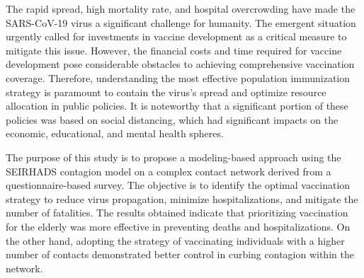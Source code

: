The rapid spread, high mortality rate, and hospital overcrowding have made the SARS-CoV-19 virus a significant challenge for humanity. The emergent situation urgently called for investments in vaccine development as a critical measure to mitigate this issue. However, the financial costs and time required for vaccine development pose considerable obstacles to achieving comprehensive vaccination coverage. Therefore, understanding the most effective population immunization strategy is paramount to contain the virus's spread and optimize resource allocation in public policies. It is noteworthy that a significant portion of these policies was based on social distancing, which had significant impacts on the economic, educational, and mental health spheres.

The purpose of this study is to propose a modeling-based approach using the SEIRHADS contagion model on a complex contact network derived from a questionnaire-based survey. The objective is to identify the optimal vaccination strategy to reduce virus propagation, minimize hospitalizations, and mitigate the number of fatalities. The results obtained indicate that prioritizing vaccination for the elderly was more effective in preventing deaths and hospitalizations. On the other hand, adopting the strategy of vaccinating individuals with a higher number of contacts demonstrated better control in curbing contagion within the network.

